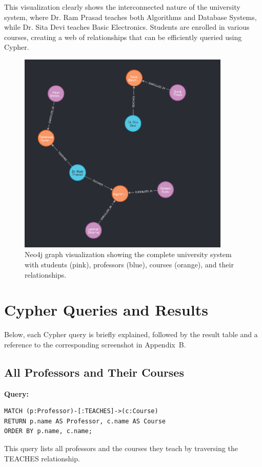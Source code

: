 This visualization clearly shows the interconnected nature of the university system, where Dr. Ram Prasad teaches both Algorithms and Database Systems, while Dr. Sita Devi teaches Basic Electronics. Students are enrolled in various courses, creating a web of relationships that can be efficiently queried using Cypher.

\begin{figure}[H]
  \centering
  \includegraphics[width=0.9\textwidth]{task-3/screenshots/graph-visualization.png}
  \caption{Neo4j graph visualization showing the complete university system with students (pink), professors (blue), courses (orange), and their relationships.}
  \label{fig:graph-visualization}
\end{figure}

\section{Cypher Queries and Results}
Below, each Cypher query is briefly explained, followed by the result table and a reference to the corresponding screenshot in Appendix~B.

\subsection{All Professors and Their Courses}
\textbf{Query:}
\begin{verbatim}
MATCH (p:Professor)-[:TEACHES]->(c:Course)
RETURN p.name AS Professor, c.name AS Course
ORDER BY p.name, c.name;
\end{verbatim}
This query lists all professors and the courses they teach by traversing the TEACHES relationship.

